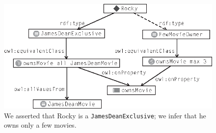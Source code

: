 \begin{figure}
\centering
\includegraphics[width=5in]{media/ch13/f13-03.eps}
\caption{We asserted that Rocky is a \texttt{JamesDeanExclusive}; we infer that he owns
only a few movies.
}
\label{fig:ch13.03}
\end{figure}



